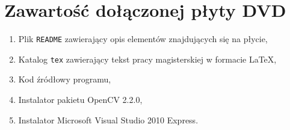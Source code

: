 \chapter{Zawartość dołączonej płyty DVD}

\begin{enumerate}
  \item Plik \texttt{README} zawierający opis elementów znajdujących się na płycie,
  \item Katalog \texttt{tex} zawierający tekst pracy magisterskiej w formacie \LaTeX,
  \item Kod źródłowy programu,
  \item Instalator pakietu OpenCV 2.2.0,
  \item Instalator Microsoft Visual Studio 2010 Express.
\end{enumerate}